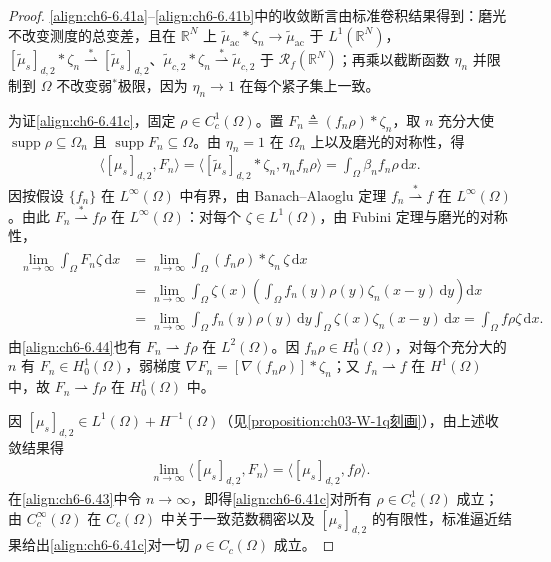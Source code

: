 \documentclass[../../main.tex]{subfiles}%
\begin{document}
\begin{proof}
\eqref{align:ch6-6.41a}--\eqref{align:ch6-6.41b}中的收敛断言由标准卷积结果得到：磨光不改变测度的总变差，且在 $\mathbb{R}^N$ 上 $\widetilde\mu_{\mathrm{ac}}*\zeta_n\to\widetilde\mu_{\mathrm{ac}}$ 于 $L^1(\mathbb{R}^N)$，$[\widetilde\mu_s]_{d,2}*\zeta_n\stackrel{*}{\rightharpoonup}[\widetilde\mu_s]_{d,2}$、$\widetilde\mu_{c,2}*\zeta_n\stackrel{*}{\rightharpoonup}\widetilde\mu_{c,2}$ 于 $\mathscr{R}_f(\mathbb{R}^N)$；再乘以截断函数 $\eta_n$ 并限制到 $\Omega$ 不改变弱$^*$极限，因为 $\eta_n\to1$ 在每个紧子集上一致。

为证\eqref{align:ch6-6.41c}，固定 $\rho\in C^1_c(\Omega)$。置 $F_n\triangleq(f_n\rho)*\zeta_n$，取 $n$ 充分大使 $\operatorname{supp}\rho\subseteq\Omega_n$ 且 $\operatorname{supp}F_n\subseteq\Omega$。由 $\eta_n=1$ 在 $\Omega_n$ 上以及磨光的对称性，得
\begin{align}
\langle[\mu_s]_{d,2},F_n\rangle
=\langle[\widetilde\mu_s]_{d,2}*\zeta_n,\eta_nf_n\rho\rangle
=\int_\Omega\beta_nf_n\rho\,\mathrm{d}x. \label{align:ch6-6.43}
\end{align}
因按假设 $\{f_n\}$ 在 $L^\infty(\Omega)$ 中有界，由 Banach--Alaoglu 定理 $f_n\stackrel{*}{\rightharpoonup}f$ 在 $L^\infty(\Omega)$。由此 $F_n\stackrel{*}{\rightharpoonup}f\rho$ 在 $L^\infty(\Omega)$：对每个 $\zeta\in L^1(\Omega)$，由 Fubini 定理与磨光的对称性，
\begin{align}
\begin{aligned}
\lim_{n\to\infty}\int_\Omega F_n\zeta\,\mathrm{d}x
&=\lim_{n\to\infty}\int_\Omega(f_n\rho)*\zeta_n\,\zeta\,\mathrm{d}x\\
&=\lim_{n\to\infty}\int_\Omega\zeta(x)\left(\int_\Omega f_n(y)\rho(y)\zeta_n(x-y)\,\mathrm{d}y\right)\mathrm{d}x\\
&=\lim_{n\to\infty}\int_\Omega f_n(y)\rho(y)\,\mathrm{d}y\int_\Omega\zeta(x)\zeta_n(x-y)\,\mathrm{d}x
=\int_\Omega f\rho\zeta\,\mathrm{d}x. 
\end{aligned}
\label{align:ch6-6.44}
\end{align}
由\eqref{align:ch6-6.44}也有 $F_n\rightharpoonup f\rho$ 在 $L^2(\Omega)$。因 $f_n\rho\in H^1_0(\Omega)$，对每个充分大的 $n$ 有 $F_n\in H^1_0(\Omega)$，弱梯度 $\nabla F_n=[\nabla(f_n\rho)]*\zeta_n$；又 $f_n\rightharpoonup f$ 在 $H^1(\Omega)$ 中，故 $F_n\rightharpoonup f\rho$ 在 $H^1_0(\Omega)$ 中。

因 $[\mu_s]_{d,2}\in L^1(\Omega)+H^{-1}(\Omega)$（见\cref{proposition:ch03-W-1q刻画}），由上述收敛结果得
\begin{align*}
\lim_{n\to\infty}\langle[\mu_s]_{d,2},F_n\rangle=\langle[\mu_s]_{d,2},f\rho\rangle.
\end{align*}
在\eqref{align:ch6-6.43}中令 $n\to\infty$，即得\eqref{align:ch6-6.41c}对所有 $\rho\in C^1_c(\Omega)$ 成立；由 $C^\infty_c(\Omega)$ 在 $C_c(\Omega)$ 中关于一致范数稠密以及 $[\mu_s]_{d,2}$ 的有限性，标准逼近结果给出\eqref{align:ch6-6.41c}对一切 $\rho\in C_c(\Omega)$ 成立。


\end{proof}
\end{document}
